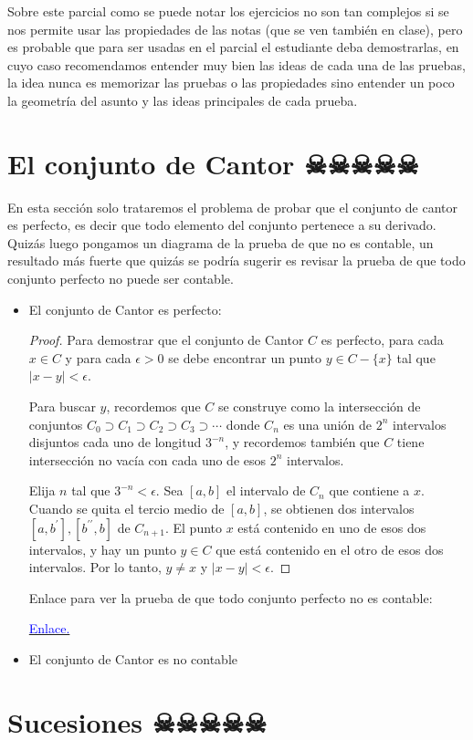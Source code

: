 \begin{note}
Sobre este parcial como se puede notar los ejercicios no son tan complejos si se nos permite usar las propiedades de las notas (que se ven también en clase), pero es probable que para ser usadas en el parcial el estudiante deba demostrarlas, en cuyo caso recomendamos entender muy bien las ideas de cada una de las pruebas, la idea nunca es memorizar las pruebas o las propiedades sino entender un poco la geometría del asunto y las ideas principales de cada prueba.
\end{note}

\section{El conjunto de Cantor ☠☠☠☠☠}

\begin{note}
En esta sección solo trataremos el problema de probar que el conjunto de cantor es perfecto, es decir que todo elemento del conjunto pertenece a su derivado. Quizás luego pongamos un diagrama de la prueba de que no es contable, un resultado más fuerte que quizás se podría sugerir es revisar la prueba de que todo conjunto perfecto no puede ser contable.
\end{note}

\begin{itemize}[label={✎}]

\item El conjunto de Cantor es perfecto:\\


\begin{proof}
Para demostrar que el conjunto de Cantor $C$ es perfecto, para cada $x \in C$ y para cada $\epsilon>0$ se debe encontrar un punto $y \in C-\{x\}$ tal que $|x-y|<\epsilon$.

Para buscar $y$, recordemos que $C$ se construye como la intersección de conjuntos $C_0 \supset C_1 \supset C_2 \supset C_3 \supset \cdots$ donde $C_n$ es una unión de $2^n$ intervalos disjuntos cada uno de longitud $3^{-n}$, y recordemos también que $C$ tiene intersección no vacía con cada uno de esos $2^n$ intervalos.

Elija $n$ tal que $3^{-n}<\epsilon$.
Sea $[a, b]$ el intervalo de $C_n$ que contiene a $x$.
Cuando se quita el tercio medio de $[a, b]$, se obtienen dos intervalos $\left[a, b^{\prime}\right],\left[b^{\prime \prime}, b\right]$ de $C_{n+1}$. El punto $x$ está contenido en uno de esos dos intervalos, y hay un punto $y \in C$ que está contenido en el otro de esos dos intervalos. Por lo tanto, $y \neq x$ y $|x-y|<\epsilon$.
\end{proof}

\begin{note}
        Enlace para ver la prueba de que todo conjunto perfecto no es contable: 

        \href{https://math.stackexchange.com/questions/201922/proof-that-a-perfect-set-is-uncountable}{\textcolor{blue}{Enlace.}} 
\end{note}

\item El conjunto de Cantor es no contable
        
\end{itemize}

\section{Sucesiones ☠☠☠☠☠}

